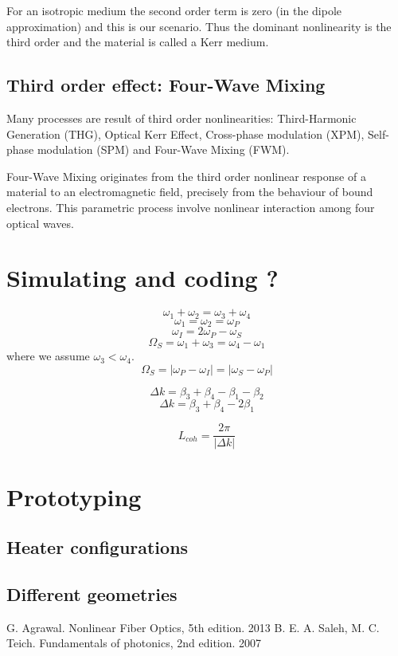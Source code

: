 \documentclass[12pt,a4paper,twocolumn,twoside]{article}
\begin{document}
For an isotropic medium the second order term is zero (in the dipole approximation) and this is our scenario.
Thus the dominant nonlinearity is the third order and the material is called a Kerr medium.
\subsection{Third order effect: Four-Wave Mixing}
Many processes are result of third order nonlinearities: Third-Harmonic Generation (THG), Optical Kerr Effect, Cross-phase modulation (XPM), Self-phase modulation (SPM) and Four-Wave Mixing (FWM).

Four-Wave Mixing originates from the third order nonlinear response of a material to an electromagnetic field, precisely from the behaviour of bound electrons.
This parametric process involve nonlinear interaction among four optical waves.
\section{Simulating and coding ?}

$$\omega_1 + \omega_2 = \omega_3 + \omega_4$$
$$\omega_1 = \omega_2 = \omega_P$$
$$\omega_I = 2\omega_P - \omega_S$$
$$\Omega_S = \omega_1 + \omega_3 = \omega_4 - \omega_1$$
where we assume $\omega_3 < \omega_4$.
$$\Omega_S = |\omega_P - \omega_I| = |\omega_S - \omega_P|$$

$$\Delta k = \beta_3 + \beta_4 - \beta_1 - \beta_2$$
$$\Delta k = \beta_3 + \beta_4 - 2\beta_1$$

$$L_{coh} = \frac{2\pi}{|\Delta k|}$$



\section{Prototyping}
\subsection{Heater configurations}
\subsection{Different geometries}

\newpage
\begin{thebibliography}{9}
 G. Agrawal. Nonlinear Fiber Optics, 5th edition. 2013
 B. E. A. Saleh, M. C. Teich. Fundamentals of photonics, 2nd edition. 2007
\end{thebibliography}
\end{document}
